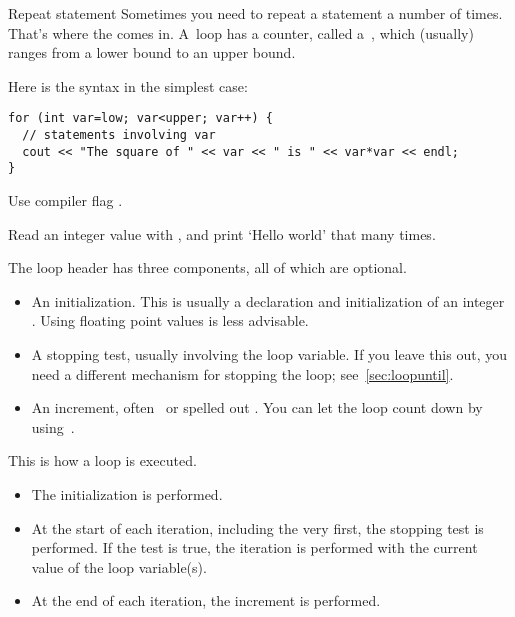 \begin{slide}{Repeat statement}
  \label{sl:for}
  Sometimes you need to repeat a statement a number of times. That's
  where the  comes in. A~loop has a counter, called
  a~, which (usually) ranges from a lower bound
  to an upper bound.

  Here is the syntax in the simplest case:
\begin{verbatim}
for (int var=low; var<upper; var++) {
  // statements involving var
  cout << "The square of " << var << " is " << var*var << endl;
}
\end{verbatim}
\begin{cnote}
Use compiler flag .
\end{cnote}
\end{slide}

\begin{exercise}
  \label{ex:manyhello}
  Read an integer value with , and print `Hello world' that many times.
\end{exercise}

The loop header has three components, all of which are optional.
\begin{itemize}
\item An initialization. This is usually a declaration and
  initialization of an integer . Using
  floating point values is less advisable.
\item A stopping test, usually
  involving the loop variable. If you leave this out, you need a
  different mechanism for stopping the loop; see~\ref{sec:loopuntil}.
\item An increment, often~ or spelled out . You can let the loop count down by using~.
\end{itemize}
This is how a loop is executed.
\begin{itemize}
\item The initialization is performed.
\item At the start of each iteration, including the very first, the
  stopping test is performed. If the test is true, the iteration is
  performed with the current value of the loop variable(s).
\item At the end of each iteration, the increment is performed.
\end{itemize}

